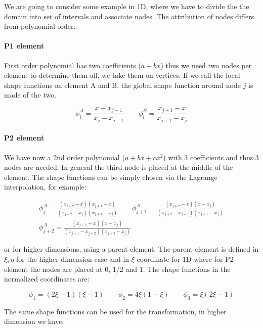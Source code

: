 We are going to consider some example in 1D, where we have to divide the the domain into set of intervals and associate nodes. The attribution of nodes differs from polynomial order. 

\paragraph{P1 element}
First order polynomial has two coefficients ($a + bx$) thus we need two nodes per element to determine them all, we take them on vertices. If we call the local shape functions on element A and B, the global shape function around node $j$ is made of the two.

\begin{equation}
\phi _i^A = \frac{x-x_{j-1}}{x_j-x_{j-1}}\qquad\phi _i^B = \frac{x_{j+1}-x}{x_{j+1}-x_j}
\end{equation}

\paragraph{P2 element}
We have now a 2nd order polynomial ($a + bx + cx^2$) with 3 coefficients and thus 3 nodes are needed. In general the third node is placed at the middle of the element. The shape functions can be simply chosen via the Lagrange interpolation, for example: 

\begin{equation}
\begin{array}{c}
\phi _j ^A = \frac{(x_{j+2} - x)(x_{j+1} - x)}{(x_{j+2} - x_j)(x_{j+1} - x_j)} \qquad \phi _{j+1} ^A = \frac{(x_{j+2} - x)(x - x_j)}{(x_{j+2} - x_{j+1})(x_{j+1}- x_{j})} \\
\phi _{j+2} ^A = \frac{(x_{j+1} - x)(x - x_j)}{(x_{j+1} - x_{j+2})(x_{j+2}- x_{j})}
\end{array}
\end{equation}

or for higher dimensions, using a parent element. The parent element is defined in $\xi , \eta$ for the higher dimension case and in $\xi$ coordinate for 1D where for P2 element the nodes are placed at 0, 1/2 and 1. The shape functions in the normalized coordinates are: 

\begin{equation}
\phi _1 = (2\xi - 1)(\xi -1)\qquad \phi _2= 4\xi (1-\xi)\qquad \phi _3 = \xi (2\xi -1)
\end{equation}

The same shape functions can be used for the transformation, in higher dimension we have: 

